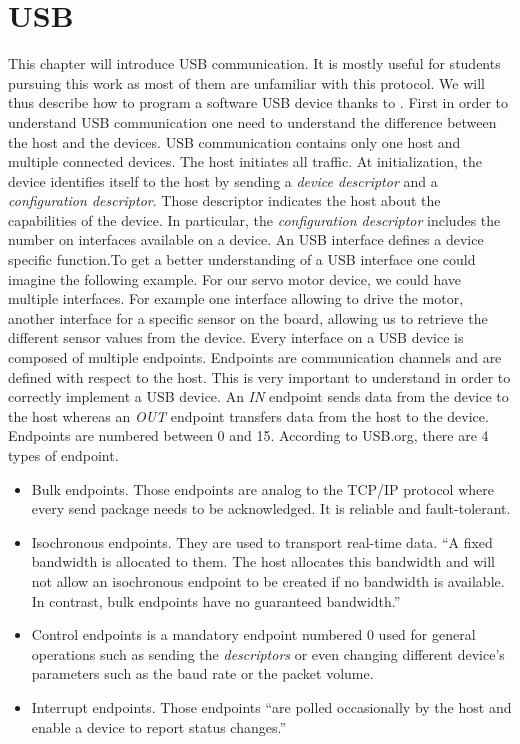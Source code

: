 \documentclass[12pt,a4paper]{report}
\begin{document}
\chapter{USB}
\label{chap:usb}
This chapter will introduce USB communication. It is mostly useful for students pursuing this work as most of them are unfamiliar with this protocol. We will thus describe how to program a software USB
device thanks to \cite{usb-explained}.\newline
First in order to understand USB communication one need to understand the difference between the host and the devices. USB communication contains only one host and multiple connected devices. The host initiates all traffic. At initialization, the device identifies itself to the host by sending a \emph{device descriptor} and a \emph{configuration descriptor}. Those descriptor indicates the host about the capabilities of the device. In particular, the \emph{configuration descriptor} includes the number on interfaces available on a device. An USB interface defines a device specific function.\newline To get a better understanding of a USB interface one could imagine the following example. For our servo motor device, we could have multiple interfaces. For example one interface allowing to drive the motor, another interface for a specific sensor on the board, allowing us to retrieve the different sensor values from the device.\newline
Every interface on a USB device is composed of multiple endpoints. Endpoints are communication channels and are defined with respect to the host. This is very important to understand in order to correctly implement a USB device. An \emph{IN} endpoint sends data from the device to the host whereas an \emph{OUT} endpoint transfers data from the host to the device. Endpoints are numbered between 0 and 15.\newline
According to USB.org, there are 4 types of endpoint.
\begin{itemize}
    \item Bulk endpoints. Those endpoints are analog to the TCP/IP protocol where every send package needs to be acknowledged. It is reliable and fault-tolerant.
    \item Isochronous endpoints. They are used to transport real-time data. ``A fixed bandwidth is allocated to them. The host allocates this bandwidth and will not allow an isochronous endpoint to be created if no bandwidth is available. In contrast, bulk endpoints have no guaranteed bandwidth.''
    \item Control endpoints is a mandatory endpoint numbered 0 used for general operations such as sending the \emph{descriptors} or even changing different device's parameters such as the baud rate or the packet volume.
    \item Interrupt endpoints. Those endpoints ``are polled occasionally by the host and enable a device to report status changes.''
\end{itemize}
\end{document}
